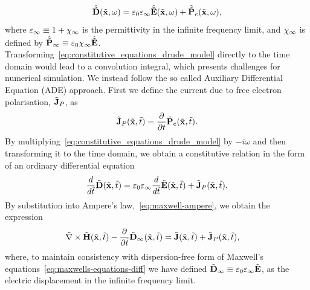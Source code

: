 \begin{equation}
  \hat{\tilde{\mathbf{D}}}(\tilde{\mathbf{x}},\omega) = \varepsilon_0 \varepsilon_{\infty} \hat{\tilde{\mathbf{E}}}(\tilde{\mathbf{x}}, \omega) + \hat{\tilde{\mathbf{P}}}_e(\tilde{\mathbf{x}},\omega) ,
\end{equation}
where $\varepsilon_{\infty} \equiv 1 + \chi_{\infty} $ is the permittivity in the
infinite frequency limit, and $\chi_{\infty}$ is defined by $\hat{\tilde{\mathbf{P}}}_{\infty}
\equiv \varepsilon_0 \chi_{\infty} \hat{\tilde{\mathbf{E}}} $.
Transforming~\eqref{eq:constitutive_equations_drude_model} directly to the time
domain would lead to a convolution integral, which presents challenges for
numerical simulation\cite{kelley1996piecewise}. We instead follow the so called
Auxiliary Differential Equation (ADE)
approach\cite{Taflove:1989ds,Niegemann:2009uv,Ji:2007dl,okoniewski1997simple,kashiwa1990treatment}.
First we define the current due to free electron polarisation, $\tilde{\mathbf{J}}_P$, as
\begin{align}
  \tilde{\mathbf{J}}_P(\tilde{\mathbf{x}},\tilde{t}) =  \frac{\partial}{\partial t} \tilde{\mathbf{P}}_e(\tilde{\mathbf{x}},\tilde{t}). \label{eq:polarisation-current-definition}
\end{align}
By multiplying~\eqref{eq:constitutive_equations_drude_model} by $ -i \omega$ and
then transforming it to the time domain, we obtain a constitutive relation in
the form of an ordinary differential equation
\begin{equation}
  \label{eq:constitutive_equations_drude_model_derivative_TD}
  \frac{d}{d \tilde{t}}  \tilde{\mathbf{D}} (\tilde{\mathbf{x}},\tilde{t})= \varepsilon_0 \varepsilon_{\infty} \frac{d}{d \tilde{t}}  \tilde{\mathbf{E}} (\tilde{\mathbf{x}}, \tilde{t}) + \tilde{\mathbf{J}}_P(\tilde{\mathbf{x}},\tilde{t}) .
\end{equation}
By substitution into Ampere's law,~\eqref{eq:maxwell-ampere}, we obtain the
expression
\begin{align}
  \tilde{\nabla} \times \tilde{\mathbf{H}}(\tilde{\mathbf{x}},\tilde{t}) - \frac{\partial}{\partial \tilde{t} } \tilde{\mathbf{D}}_{\infty}(\tilde{\mathbf{x}}, \tilde{t}) &= \tilde{\mathbf{J}}(\tilde{\mathbf{x}},\tilde{t}) + \tilde{\mathbf{J}}_P(\tilde{\mathbf{x}},\tilde{t}) , \label{eq:drude-ampere}
\end{align}
where, to maintain consistency with dispersion-free form of Maxwell's
equations~\eqref{eq:maxwells-equations-diff} we have defined $\tilde{\mathbf{D}}_{\infty}
\equiv \varepsilon_0 \varepsilon_{\infty} \tilde{\mathbf{E}}$, as the electric displacement in the
infinite frequency limit.

